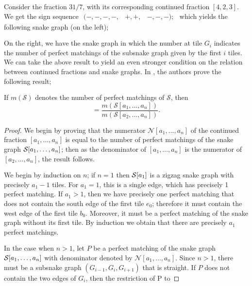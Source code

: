\begin{example}\label{Ex3.5}
Consider the fraction $31/7$, with its corresponding continued fraction $[4,2,3]$. We get the sign sequence
$
\begin{array}{ccc}
  ( -,-,-,-,&  +,+,&  -,-,-);
\end{array}
$
which yields the following snake graph (on the left);
\begin{figure}[H]
    \centering
    
\end{figure}
\end{example}
On the right, we have the snake graph in which the number at tile $G_i$ indicates the number of perfect matchings of the subsnake graph given by the first $i$ tiles.  
We can take the above result to yield an even stronger condition on the relation between continued fractions and snake graphs. In \cite{CS2}, the authors prove the following result;
\begin{theorem}\label{thm3.6}
    If $m(\mathcal{S})$ denotes the number of perfect matchings of $\mathcal{S}$, then
    \begin{equation*}
        [a_1,\dots,a_n] = \dfrac{m(\mathcal{S}[a_1,\dots,a_n])}{m(\mathcal{S}[a_2,\dots,a_n])}.
    \end{equation*}
\end{theorem}
\begin{proof}
    We begin by proving that the numerator $\mathcal{N}[a_1,\dots,a_n]$ of the continued fraction $[a_1,\dots,a_n]$ is equal to the number of perfect matchings of the snake graph $\mathcal{S}[a_1,\dots,a_n]$; then as the denominator of $[a_1,\dots,a_n]$ is the numerator of $[a_2,\dots,a_n]$, the result follows.

    We begin by induction on $n$; if $n=1$ then $\mathcal{S}[a_1]$ is a zigzag snake graph with precisely $a_1-1$ tiles. For $a_1 = 1$, this is a single edge, which has precisely 1 perfect matching. If $a_1 > 1$, then we have precisely one perfect matching that does not contain the south edge of the first tile $e_0$; therefore it must contain the west edge of the first tile $b_0$. Moreover, it must be a perfect matching of the snake graph without its first tile. By induction we obtain that there are precisely $a_1$ perfect matchings. 

    In the case when $n>1$, let $P$ be a perfect matching of the snake graph $\mathcal{S}[a_1,\dots,a_n]$ with denominator denoted by $\mathcal{N}[a_1,\dots,a_n]$. Since $n>1$, there must be a subsnake graph $(G_{i-1},G_i,G_{i+1})$ that is straight. If $P$ does not contain the two edges of $G_i$, then the restriction of P to 
\end{proof}
